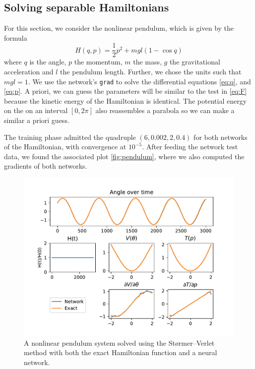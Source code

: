 \documentclass{article}
\begin{document}
\subsection{Solving separable Hamiltonians}
For this section, we consider the nonlinear pendulum, which is given by the formula
\begin{equation}
    H(q, p) = \frac{1}{2} p^2 + mgl(1- \cos{q})
\end{equation}
where $q$ is the angle, $p$ the momentum, $m$ the mass, $g$ the gravitational acceleration and $l$ the pendulum length. Further, we chose the units such that $mgl = 1$. We use the network's \verb|grad| to solve the differential equations \eqref{eq:q}, and \eqref{eq:p}. A priori, we can guess the parameters will be similar to the test in \ref{eq:F} because the kinetic energy of the Hamiltonian is identical. The potential energy on the on an interval $[0,2\pi]$ also reassembles a parabola so we can make a similar a priori guess. 

The training phase admitted the quadruple $(6, 0.002, 2, 0.4)$ for both networks of the Hamiltonian, with convergence at $10^{-5}$. After feeding the network test data, we found the associated plot \autoref{fig:pendulum}, where we also computed the gradients of both networks.  
\begin{figure}[h!]
    \centering
    \includegraphics[width=\linewidth, trim={0 0.4cm 0 0.6cm}, clip]{pendulum.pdf}
    \caption{A nonlinear pendulum system solved using the Størmer--Verlet method with both the exact Hamiltonian function and a neural network.}
    \label{fig:pendulum}
\end{figure}
\end{document}
